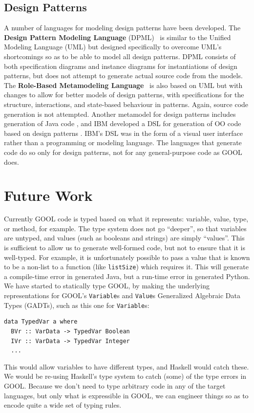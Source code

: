 \documentclass[sigplan,review,anonymous,prologue,dvipsnames]{acmart}
\begin{document}
\subsection{Design Patterns}

A number of languages for modeling design patterns have been developed. The
\textbf{Design Pattern Modeling Language} (DPML)~\cite{mapelsden2002design} is similar
to the Unified Modeling Language (UML) but designed specifically to overcome
UML's shortcomings so as to be able to model all design patterns. DPML consists of
both specification diagrams and instance diagrams for instantiations of design
patterns, but does not attempt to generate actual source code from the models.
The \textbf{Role-Based Metamodeling Language}~\cite{kim2003uml} is also based on UML but
with changes to allow for better models of design patterns, with specifications
for the structure, interactions, and state-based behaviour in patterns. Again,
source code generation is not attempted. Another metamodel for design patterns
includes generation of Java code \cite{albin2001meta}, and IBM developed a DSL
for generation of OO code based on design patterns
\cite{budinsky1996automatic}. IBM's DSL was in the form of a visual user
interface rather than a programming or modeling language. The languages that
generate code do so only for design patterns, not for any general-purpose code
as GOOL does.

\section{Future Work} \label{sec:future}

Currently GOOL code is typed based on what it represents:
variable, value, type, or method, for example. The type system does not
go ``deeper'', so that variables are untyped, and values (such as booleans
and strings) are simply ``values''.  This is sufficient to allow us to
generate well-formed code, but not to ensure that it is well-typed.
For example, it is unfortunately possible to pass a value that is known
to be a non-list to a function (like \verb|listSize|) which requires it.
This will generate a compile-time error in generated Java, but a run-time error
in generated Python.  We have started to statically type GOOL, by making
the underlying representations for 
GOOL's \verb|Variable|s and \verb|Value|s Generalized Algebraic Data Types
(GADTs), such as this one for \verb|Variable|s:
\begin{lstlisting}
data TypedVar a where
  BVr :: VarData -> TypedVar Boolean
  IVr :: VarData -> TypedVar Integer
  ...
\end{lstlisting}
This would allow variables to have different types, and Haskell would catch
these. We would be re-using Haskell's type system to catch (some) of the
type errors in GOOL.  Because we don't need to type arbitrary code in any
of the target languages, but only what is expressible in GOOL, we can
engineer things so as to encode quite a wide set of typing rules.
\end{document}
